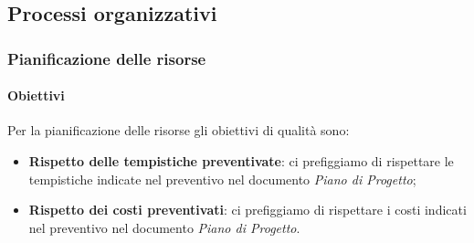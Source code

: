 			

	\subsection{Processi organizzativi}
		\subsubsection{Pianificazione delle risorse}
			\paragraph{Obiettivi}
			Per la pianificazione delle risorse gli obiettivi di qualità sono:
			\begin{itemize}
				\item \textbf{Rispetto delle tempistiche preventivate}: ci prefiggiamo di rispettare le tempistiche indicate nel preventivo nel documento \textit{Piano di Progetto};
				\item \textbf{Rispetto dei costi preventivati}: ci prefiggiamo di rispettare i costi indicati nel preventivo nel documento \textit{Piano di Progetto}.
			\end{itemize}	
